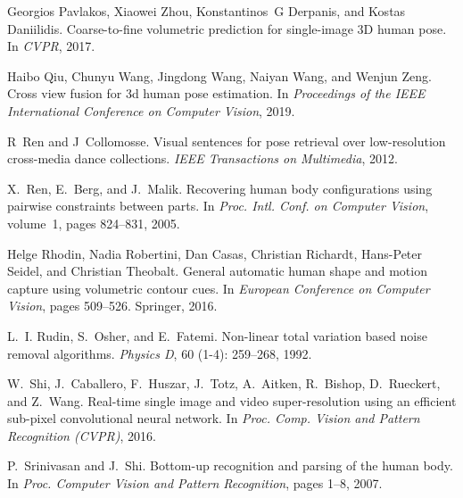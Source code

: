 \documentclass{bmvc2k}
\begin{document}
\begin{thebibliography}{47}
Georgios Pavlakos, Xiaowei Zhou, Konstantinos~G Derpanis, and Kostas
  Daniilidis.
\newblock Coarse-to-fine volumetric prediction for single-image 3{D} human
  pose.
\newblock In \emph{CVPR}, 2017.

Haibo Qiu, Chunyu Wang, Jingdong Wang, Naiyan Wang, and Wenjun Zeng.
\newblock Cross view fusion for 3d human pose estimation.
\newblock In \emph{Proceedings of the IEEE International Conference on Computer
  Vision}, 2019.

R~Ren and J~Collomosse.
\newblock Visual sentences for pose retrieval over low-resolution cross-media
  dance collections.
\newblock \emph{IEEE Transactions on Multimedia}, 2012.

X.~Ren, E.~Berg, and J.~Malik.
\newblock Recovering human body configurations using pairwise constraints
  between parts.
\newblock In \emph{Proc. Intl. Conf. on Computer Vision}, volume~1, pages
  824--831, 2005.

Helge Rhodin, Nadia Robertini, Dan Casas, Christian Richardt, Hans-Peter
  Seidel, and Christian Theobalt.
\newblock General automatic human shape and motion capture using volumetric
  contour cues.
\newblock In \emph{European Conference on Computer Vision}, pages 509--526.
  Springer, 2016.

L.~I. Rudin, S.~Osher, and E.~Fatemi.
\newblock Non-linear total variation based noise removal algorithms.
\newblock \emph{Physics D}, 60 (1-4): 259--268, 1992.

W.~Shi, J.~Caballero, F.~Huszar, J.~Totz, A.~Aitken, R.~Bishop, D.~Rueckert,
  and Z.~Wang.
\newblock Real-time single image and video super-resolution using an efficient
  sub-pixel convolutional neural network.
\newblock In \emph{Proc. Comp. Vision and Pattern Recognition (CVPR)}, 2016.

P.~Srinivasan and J.~Shi.
\newblock Bottom-up recognition and parsing of the human body.
\newblock In \emph{Proc. Computer Vision and Pattern Recognition}, pages 1--8,
  2007.


\end{thebibliography}
\end{document}
